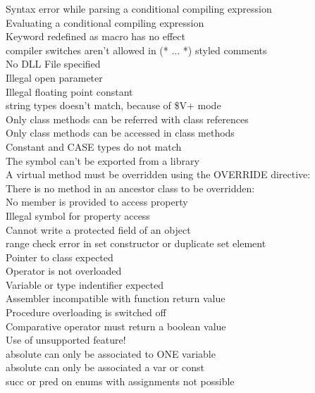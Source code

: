\documentclass{report}
\begin{document}
\begin{description}
\item [ Syntax error while parsing a conditional compiling expression ]
\item [ Evaluating a conditional compiling expression ]
\item [ Keyword redefined as macro has no effect ]
\item [ compiler switches aren't allowed in (* ... *) styled comments ]
\item [ No DLL File specified ]
\item [ Illegal open parameter ]
\item [ Illegal floating point constant ]
\item [ string types doesn't match, because of \$V+ mode ]
\item [ Only class methods can be referred with class references ]
\item [ Only class methods can be accessed in class methods ]
\item [ Constant and CASE types do not match ]
\item [ The symbol can't be exported from a library ]
\item [ A virtual method must be overridden using the OVERRIDE directive:  ]
\item [ There is no method in an ancestor class to be overridden: ]
\item [ No member is provided to access property ]
\item [ Illegal symbol for property access ]
\item [ Cannot write a protected field of an object ]
\item [ range check error in set constructor or duplicate set element ]
\item [ Pointer to class expected ]
\item [ Operator is not overloaded ]
\item [ Variable or type indentifier expected ]
\item [ Assembler incompatible with function return value ]
\item [ Procedure overloading is switched off ]
\item [ Comparative operator must return a boolean value ]
\item [ Use of unsupported feature! ]
\item [ absolute can only be associated to ONE variable ]
\item [ absolute can only be associated a var or const ]
\item [ succ or pred on enums with assignments not possible ]

\end{description}
\end{document}
